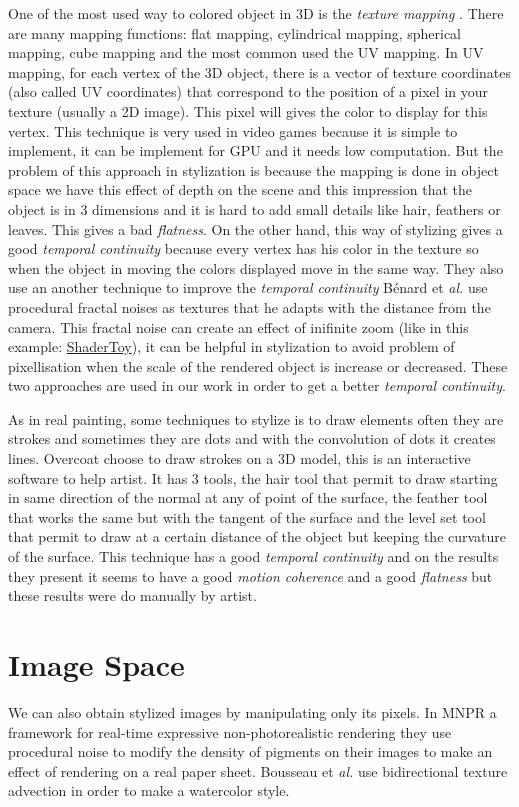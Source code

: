 One of the most used way to colored object in 3D is the \textit{texture mapping} \cite{texture_mapping}. There are many mapping functions: flat mapping, cylindrical mapping, spherical mapping, cube mapping and the most common used the UV mapping. In UV mapping, for each vertex of the 3D object, there is a vector of texture coordinates (also called UV coordinates) that correspond to the position of a pixel in your texture (usually a 2D image). This pixel will gives the color to display for this vertex. This technique is very used in video games because it is simple to implement, it can be implement for GPU and it needs low computation. But the problem of this approach in stylization is because the mapping is done in object space we have this effect of depth on the scene and this impression that the object is in 3 dimensions and it is hard to add small details like hair, feathers or leaves. This gives a bad \textit{flatness}. On the other hand, this way of stylizing gives a good \textit{temporal continuity} \cite{benard_dynamic_2009} because every vertex has his color in the texture so when the object in moving the colors displayed move in the same way. They also use an another technique to improve the \textit{temporal continuity} Bénard et \textit{al.} \cite{benard_dynamic_2009} use procedural fractal noises as textures that he adapts with the distance from the camera. This fractal noise can create an effect of inifinite zoom (like in this example: \href{https://www.shadertoy.com/view/XlBXWw?fbclid=IwAR1fU2JxQzXtks1ZcmVmzrHiv646G8w2gWceeiV-UToeFkAFMQ2NecbsGGs}{ShaderToy}), it can be helpful in stylization to avoid problem of pixellisation when the scale of the rendered object is increase or decreased. These two approaches are used in our work in order to get a better \textit{temporal continuity}.


As in real painting, some techniques to stylize is to draw elements often they are strokes and sometimes they are dots and with the convolution of dots it creates lines. Overcoat\cite{schmid_overcoat:_2011} choose to draw strokes on a 3D model, this is an interactive software to help artist. It has 3 tools, the hair tool that permit to draw starting in same direction of the normal at any of point of the surface, the feather tool that works the same but with the tangent of the surface and the level set tool that permit to draw at a certain distance of the object but keeping the curvature of the surface. This technique has a good \textit{temporal continuity} and on the results they present it seems to have a good \textit{motion coherence} and a good \textit{flatness} but these results were do manually by artist.

\section{Image Space}

We can also obtain stylized images by manipulating only its pixels. In MNPR\cite{montesdeoca_mnpr:_2018} a framework for real-time expressive non-photorealistic rendering they use procedural noise to modify the density of pigments on their images to make an effect of rendering on a real paper sheet. Bousseau et \textit{al.}\cite{bousseau_video_2007} use bidirectional texture advection in order to make a watercolor style.
